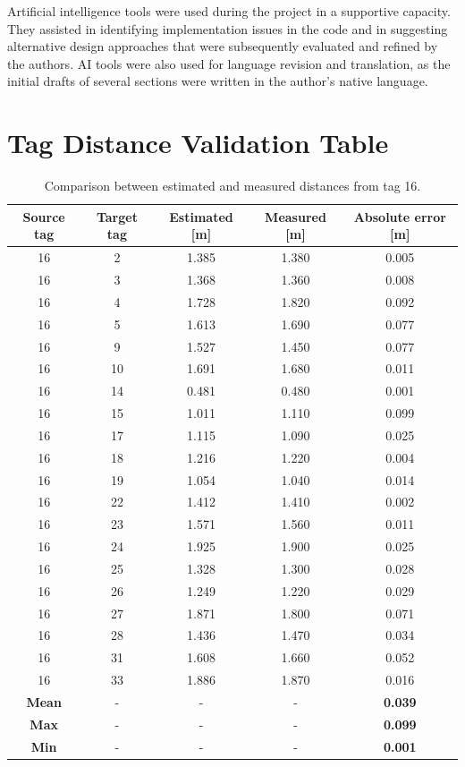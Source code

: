 \documentclass[a4paper,11pt]{article}
\begin{document}
Artificial intelligence tools were used during the project in a supportive capacity. They assisted in identifying implementation issues in the code and in suggesting alternative design approaches that were subsequently evaluated and refined by the authors. AI tools were also used for language revision and translation, as the initial drafts of several sections were written in the author's native language.

\newpage
\printbibliography
\newpage
\appendix
\addappheadtotoc
\appendixpage
\section{Tag Distance Validation Table}
\label{app:tag16_distance_table}

\begin{table}[h!]
		\centering
		\scriptsize
	\begin{tabular}{|c|c|c|c|c|}
		\hline
		\textbf{Source tag} & \textbf{Target tag} & \textbf{Estimated [m]} & \textbf{Measured [m]} & \textbf{Absolute error [m]} \\ \hline
		16 & 2  & 1.385 & 1.380 & 0.005 \\ \hline
		16 & 3  & 1.368 & 1.360 & 0.008 \\ \hline
		16 & 4  & 1.728 & 1.820 & 0.092 \\ \hline
		16 & 5  & 1.613 & 1.690 & 0.077 \\ \hline
		16 & 9  & 1.527 & 1.450 & 0.077 \\ \hline
		16 & 10 & 1.691 & 1.680 & 0.011 \\ \hline
		16 & 14 & 0.481 & 0.480 & 0.001 \\ \hline
		16 & 15 & 1.011 & 1.110 & 0.099 \\ \hline
		16 & 17 & 1.115 & 1.090 & 0.025 \\ \hline
		16 & 18 & 1.216 & 1.220 & 0.004 \\ \hline
		16 & 19 & 1.054 & 1.040 & 0.014 \\ \hline
		16 & 22 & 1.412 & 1.410 & 0.002 \\ \hline
		16 & 23 & 1.571 & 1.560 & 0.011 \\ \hline
		16 & 24 & 1.925 & 1.900 & 0.025 \\ \hline
		16 & 25 & 1.328 & 1.300 & 0.028 \\ \hline
		16 & 26 & 1.249 & 1.220 & 0.029 \\ \hline
		16 & 27 & 1.871 & 1.800 & 0.071 \\ \hline
		16 & 28 & 1.436 & 1.470 & 0.034 \\ \hline
		16 & 31 & 1.608 & 1.660 & 0.052 \\ \hline
		16 & 33 & 1.886 & 1.870 & 0.016 \\ \hline
		\textbf{Mean} & - & - & - & \textbf{0.039} \\ \hline
		\textbf{Max} & - & - & - & \textbf{0.099} \\ \hline
		\textbf{Min} & - & - & - & \textbf{0.001} \\ \hline
	\end{tabular}
	\caption{Comparison between estimated and measured distances from tag 16.}
		\label{tab:tag16_est_vs_meas_appendix}
\end{table}
\end{document}
